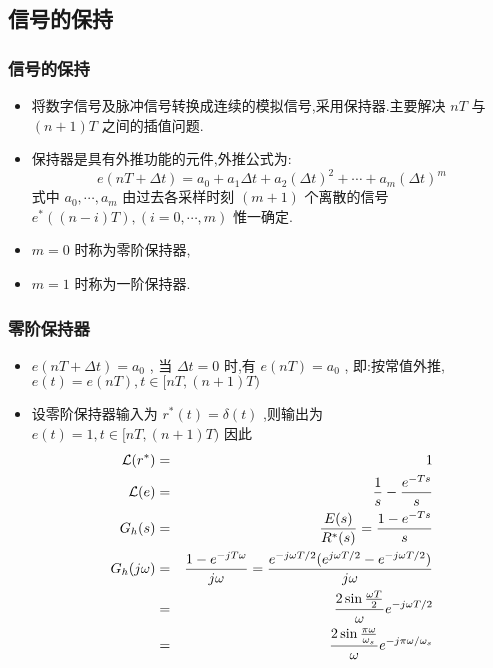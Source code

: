 \documentclass[table]{article}
\begin{document}
\subsection{信号的保持}
\label{sec-2-3}
\begin{frame}
\frametitle{信号的保持}
\label{sec-2-3-1}

\begin{itemize}
\item <2->将数字信号及脉冲信号转换成连续的模拟信号,采用保持器.主要解决  $nT$  与  $(n+1)T$  之间的插值问题.
\item <3->保持器是具有外推功能的元件,外推公式为:  
	  \[e(nT+\Delta t)=a_0+a_1 \Delta t+a_2(\Delta t)^2+\cdots+a_m(\Delta t)^m\]
    式中  $a_0,\cdots,a_m$  由过去各采样时刻  $(m+1)$ 个离散的信号  $e^*((n-i)T),(i=0,\cdots,m)$  惟一确定.
\item <4-> $m=0$ 时称为零阶保持器,
\item <5-> $m=1$ 时称为一阶保持器.
\end{itemize}
\end{frame}
\begin{frame}
\frametitle{零阶保持器}
\label{sec-2-3-2}

\begin{itemize}
\item <2-> $e(nT+\Delta t)=a_0$  , 当  $\Delta t=0$  时,有  $e(nT)=a_0$ , 即:按常值外推,  $e(t)=e(nT),t\in [ nT,(n+1)T)$
\item <3-> 设零阶保持器输入为  $r^*(t)=\delta(t)$  ,则输出为  $e(t)=1,t\in [ nT,(n+1)T)$  因此
      \begin{eqnarray*}
      {\cal L} (r^*) &=& 1 \\
      {\cal L} (e) &=& \frac{1}{s}-\frac{e^{-Ts}}{s} \\
      G_h(s) &=& \frac{E(s)}{R^*(s)}
	     = \frac{1-e^{-Ts}}{s} \\
      G_h(j\omega) &= &\frac{1-e^{-jT\omega}}{j\omega} 
       = \frac{e^{-j\omega T/2}(e^{j\omega T/2}-e^{-j\omega T/2})}{j\omega}\\
       &=& \frac{2\sin\frac{\omega T}{2}}{\omega}e^{-j\omega T/2} \\
       &=& \frac{2\sin\frac{\pi\omega}{\omega_s}}{\omega}e^{-j\pi\omega /\omega_s} 
      \end{eqnarray*}
\end{itemize}
\end{frame}
\end{document}
